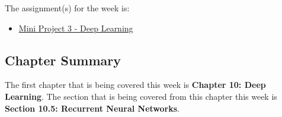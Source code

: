 The assignment(s) for the week is:

\begin{itemize}
    \item \href{https://github.com/cu-cspb-4622-fall-2024/P3-QuantumCompiler}{Mini Project 3 - Deep Learning}
\end{itemize}

\newpage

\subsection{Chapter Summary}

The first chapter that is being covered this week is \textbf{Chapter 10: Deep Learning}. The section that is being covered from this chapter this week is \textbf{Section 10.5: Recurrent Neural Networks}.

